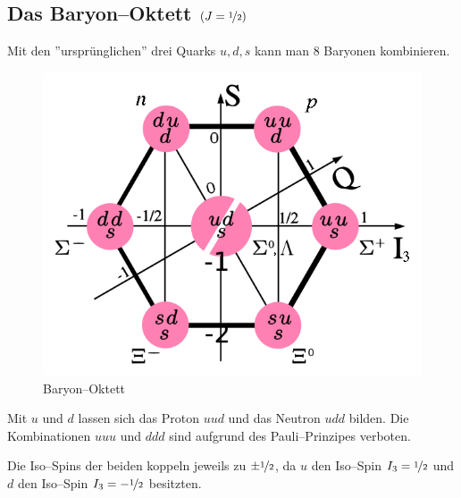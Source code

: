 \documentclass[Ex4_Zusammenfassung.tex]{subfiles}
\begin{document}
\subsection{Das Baryon--Oktett $(J=\nicefrac{1}{2})$}
Mit den ''ursprünglichen'' drei Quarks 	$u,d,s$ kann man 8 Baryonen kombinieren.
\begin{figure}[h]
	\centering
	\includegraphics[scale=0.4]{Baryon-octet.png}
	\caption{Baryon--Oktett}
\end{figure}
Mit $u$ und $d$ lassen sich das Proton $uud$ und das Neutron $udd$ bilden. Die Kombinationen $uuu$ und $ddd$ sind aufgrund des Pauli--Prinzipes verboten. 

Die Iso--Spins der beiden koppeln jeweils zu $\pm \nicefrac{1}{2}$, da $u$ den Iso--Spin $I_3 = \nicefrac{1}{2}$ und $d$ den Iso--Spin $I_3 = -\nicefrac{1}{2}$ besitzten. 
\end{document}
